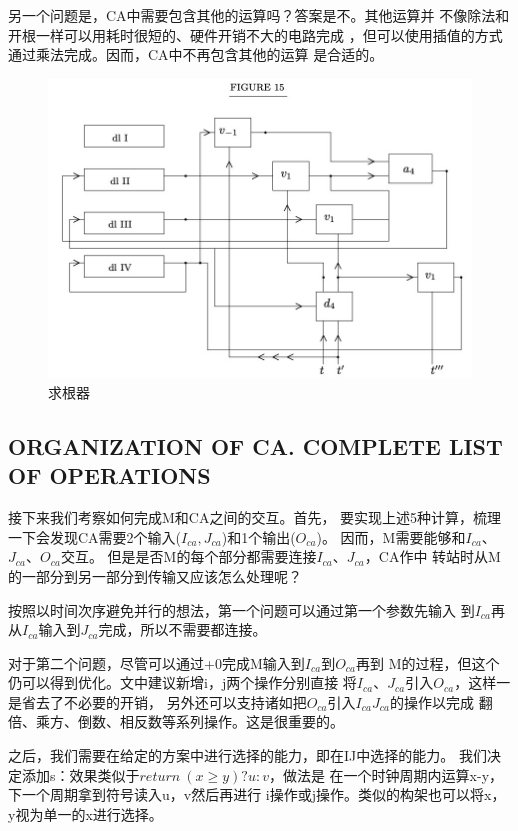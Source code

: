 \documentclass[UTF8]{ctexart}
\begin{document}
另一个问题是，CA中需要包含其他的运算吗？答案是不。其他运算并
不像除法和开根一样可以用耗时很短的、硬件开销不大的电路完成
，但可以使用插值的方式通过乘法完成。因而，CA中不再包含其他的运算
是合适的。

\begin{figure}[H]
\centering
\includegraphics[width=\textwidth]{./pics/14.jpeg}
\caption{求根器}
\end{figure}

\subsection{ORGANIZATION OF CA. COMPLETE LIST OF OPERATIONS}

接下来我们考察如何完成M和CA之间的交互。首先，
要实现上述5种计算，梳理一下会发现CA需要2个输入($I_{ca}, J_{ca}$)和1个输出($O_{ca}$)。
因而，M需要能够和$I_{ca}$、$J_{ca}$、$O_{ca}$交互。
但是是否M的每个部分都需要连接$I_{ca}$、$J_{ca}$，CA作中
转站时从M的一部分到另一部分到传输又应该怎么处理呢？

按照以时间次序避免并行的想法，第一个问题可以通过第一个参数先输入
到$I_{ca}$再从$I_{ca}$输入到$J_{ca}$完成，所以不需要都连接。

对于第二个问题，尽管可以通过+0完成M输入到$I_{ca}$到$O_{ca}$再到
M的过程，但这个仍可以得到优化。文中建议新增i，j两个操作分别直接
将$I_{ca}$、$J_{ca}$引入$O_{ca}$，这样一是省去了不必要的开销，
另外还可以支持诸如把$O_{ca}$引入$I_{ca}J_{ca}$的操作以完成
翻倍、乘方、倒数、相反数等系列操作。这是很重要的。

之后，我们需要在给定的方案中进行选择的能力，即在IJ中选择的能力。
我们决定添加s：效果类似于$return\ (x\geq y)?u:v$，做法是
在一个时钟周期内运算x-y，下一个周期拿到符号读入u，v然后再进行
i操作或j操作。类似的构架也可以将x，y视为单一的x进行选择。
\end{document}

